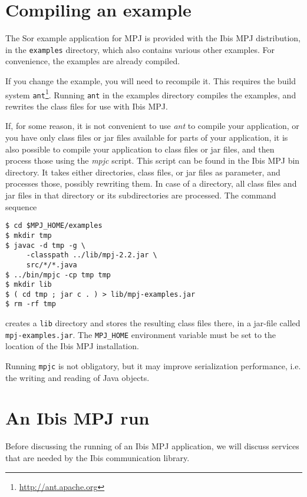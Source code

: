 \documentclass[a4paper,10pt]{article}
\begin{document}
\section{Compiling an example}

The Sor example application for MPJ is
provided with the Ibis MPJ distribution, in the \texttt{examples} directory,
which also contains various other examples.
For convenience, the examples are already compiled.

If you change the example, you will need to recompile it. This
requires the build system \texttt{ant}\footnote{\url{http://ant.apache.org}}.
Running \texttt{ant} in the examples directory compiles the examples,
and rewrites the class files for use with Ibis MPJ.

If, for some reason, it is not convenient to use \emph{ant} to compile
your application, or you have only class files or jar files available
for parts of your application, it is also possible to compile
your application to class files or jar files, and then process those
using the \emph{mpjc} script. This script can be found in the Ibis MPJ
bin directory. It takes either directories, class files, or jar files
as parameter, and processes those, possibly rewriting them. In case
of a directory, all class files and jar files in that directory or
its subdirectories are processed.  The command sequence

\begin{verbatim}
$ cd $MPJ_HOME/examples
$ mkdir tmp
$ javac -d tmp -g \
     -classpath ../lib/mpj-2.2.jar \
     src/*/*.java
$ ../bin/mpjc -cp tmp tmp
$ mkdir lib
$ ( cd tmp ; jar c . ) > lib/mpj-examples.jar
$ rm -rf tmp
\end{verbatim}

creates a \texttt{lib} directory and stores the resulting class files there,
in a jar-file called \texttt{mpj-examples.jar}.
The \texttt{MPJ\_HOME} environment variable must be set to the location of
the Ibis MPJ installation.

Running \texttt{mpjc} is not obligatory, but it may improve 
serialization performance, i.e. the writing and reading of Java objects.

\section{An Ibis MPJ run}

Before discussing
the running of an Ibis MPJ application, we will discuss services that are
needed by the Ibis communication library.
\end{document}
